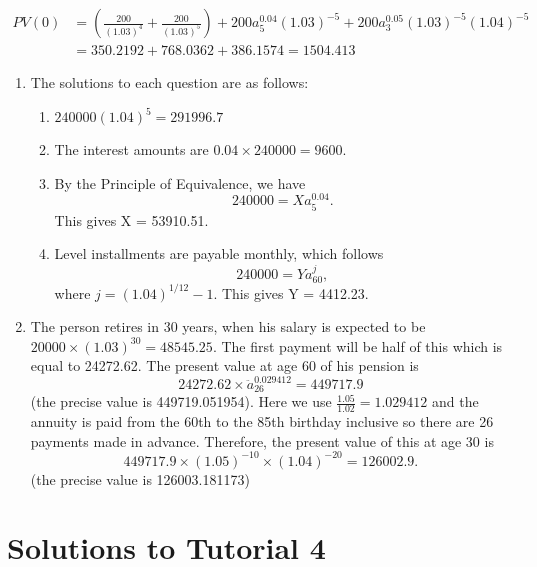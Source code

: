 \documentclass[
]{article}
\providecommand{\tightlist}{%
  \setlength{\itemsep}{0pt}\setlength{\parskip}{0pt}}
\theoremstyle{definition}
\theoremstyle{definition}
\theoremstyle{definition}
\theoremstyle{definition}
\theoremstyle{remark}
\begin{document}
\[\begin{aligned}
    PV(0) &= \left( \frac{200}{(1.03)^4} + \frac{200}{(1.03)^5}\right) + 200 a^{0.04}_5 (1.03)^{-5} + 200 a^{0.05}_{3} (1.03)^{-5} (1.04)^{-5} \\
    &= 350.2192 + 768.0362 + 386.1574 = 1504.413
\end{aligned}\]

\begin{enumerate}
\def\labelenumi{\arabic{enumi}.}
\setcounter{enumi}{2}
\item
  The solutions to each question are as follows:

  \begin{enumerate}
  \def\labelenumii{\arabic{enumii}.}
  \tightlist
  \item
    \(240000 (1.04)^5 = 291996.7\)
  \item
    The interest amounts are \(0.04\times 240000 = 9600.\)
  \item
    By the Principle of Equivalence, we have
    \[ 240000 = X a^{0.04}_{5}. \]
    This gives X = 53910.51.
  \item
    Level installments are payable monthly, which follows
    \[ 240000 = Y a^{j}_{60}, \]
    where \(j = (1.04)^{1/12} - 1\). This gives Y = 4412.23.
  \end{enumerate}
\item
  The person retires in 30 years, when his salary is expected to be
  \(20000 \times (1.03)^{30} = 48545.25.\)
  The first payment will be half of this which is equal to 24272.62.
  The present value at age 60 of his pension is
  \[  24272.62 \times \ddot{a}^{0.029412}_{26} = 449717.9\] (the precise value is 449719.051954).
  Here we use \(\frac{1.05}{1.02} = 1.029412\) and the annuity is paid from the 60th to the 85th birthday inclusive so there are 26 payments made in advance.
  Therefore, the present value of this at age 30 is
  \[ 449717.9 \times (1.05)^{-10} \times (1.04)^{-20} = 126002.9. \]
  (the precise value is 126003.181173)
\end{enumerate}

\hypertarget{solutions-to-tutorial-4}{%
\section{Solutions to Tutorial 4}\label{solutions-to-tutorial-4}}
\end{document}
